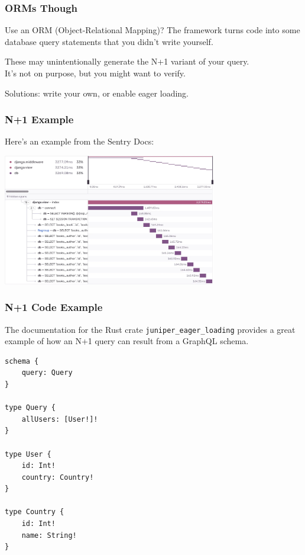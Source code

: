 \begin{frame}
\frametitle{ORMs Though}

Use an ORM (Object-Relational Mapping)? The framework turns code into some database query statements that you didn't write yourself.

These may unintentionally generate the N+1 variant of your query.\\
\quad It's not on purpose, but you might want to verify.

Solutions: write your own, or enable eager loading.

\end{frame}

\begin{frame}
\frametitle{N+1 Example}

Here's an example from the Sentry Docs:
\begin{center}
  \includegraphics[width=0.7\textwidth]{images/nplusone.png}
\end{center}

\end{frame}

\begin{frame}[fragile]
\frametitle{N+1 Code Example}
The documentation for the Rust crate \texttt{juniper\_eager\_loading} provides a great example of how an N+1 query can result from a GraphQL schema. 


\begin{lstlisting}
schema {
    query: Query
}

type Query {
    allUsers: [User!]!
}

type User {
    id: Int!
    country: Country!
}

type Country {
    id: Int!
    name: String!
}
\end{lstlisting}

\end{frame}

